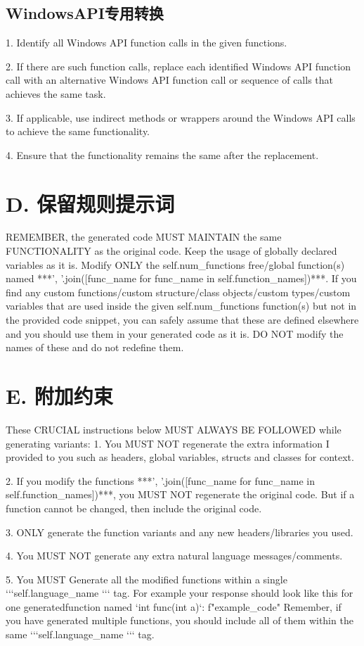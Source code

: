 \subsection{WindowsAPI专用转换}
1. Identify all Windows API function calls in the given functions.

2. If there are such function calls, replace each identified Windows API function call with an alternative Windows API function call or sequence of calls that achieves the same task.

3. If applicable, use indirect methods or wrappers around the Windows API calls to achieve the same functionality.

4. Ensure that the functionality remains the same after the replacement.

\section{D. 保留规则提示词}
REMEMBER, the generated code MUST MAINTAIN the same FUNCTIONALITY as the original code. Keep the usage of globally declared variables as it is. Modify ONLY the self.num\_functions free/global function(s) named ***’, ’.join([func\_name for func\_name in self.function\_names])***. If you find any custom functions/custom structure/class objects/custom types/custom variables that are used inside the given self.num\_functions function(s) but not in the provided code snippet, you can safely assume that these are defined elsewhere and you should use them in your generated code as it is. DO NOT modify the names of these and do not redefine them.

\section{E. 附加约束}
These CRUCIAL instructions below MUST ALWAYS BE FOLLOWED while generating variants:
1. You MUST NOT regenerate the extra information I provided to you such as headers, global variables, structs and classes for context.

2. If you modify the functions ***’, ’.join([func\_name for func\_name in self.function\_names])***, you MUST NOT regenerate the original code. But if a function cannot be changed, then include the original code. 

3. ONLY generate the function variants and any new headers/libraries you used.

4. You MUST NOT generate any extra natural language messages/comments.

5. You MUST Generate all the modified functions within a single ‘‘‘self.language\_name ‘‘‘ tag. For example your response should look like this for one generatedfunction named ‘int func(int a)‘: f"{example\_code}" Remember, if you have generated multiple functions, you should include all of them within the same ‘‘‘self.language\_name ‘‘‘ tag.

